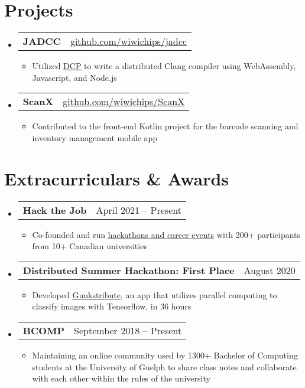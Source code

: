 \documentclass[letterpaper,11pt]{article}
\makeatletter
\newcommand{\resumeItem}[1]{
  \item\small{
    {#1 \vspace{-2pt}}
  }
}
\newcommand{\resumeProjectHeading}[2]{
    \item
    \begin{tabular*}{0.97\textwidth}{l@{\extracolsep{\fill}}r}
      \small#1 & #2 \\
    \end{tabular*}\vspace{-7pt}
}
\newcommand{\resumeSubHeadingListStart}{\begin{itemize}[leftmargin=0.15in, label={}]}
\newcommand{\resumeSubHeadingListEnd}{\end{itemize}}
\newcommand{\resumeItemListStart}{\begin{itemize}}
\newcommand{\resumeItemListEnd}{\end{itemize}\vspace{-5pt}}
\makeatother
\begin{document}
\section{Projects}
  \resumeSubHeadingListStart
    \resumeProjectHeading
      {\textbf{JADCC}}{\href{https://github.com/wiwichips/jadcc}{\underline{github.com/wiwichips/jadcc}}}
      \resumeItemListStart
        \resumeItem{Utilized \href{https://dcp.dev/}{\underline{DCP}} to write a distributed Clang compiler using WebAssembly, Javascript, and Node.js }
      \resumeItemListEnd
        
    \resumeProjectHeading
      {\textbf{ScanX}}{\href{https://github.com/wiwichips/ScanX}{\underline{github.com/wiwichips/ScanX}}}
      \resumeItemListStart
        \resumeItem{Contributed to the front-end Kotlin project for the barcode scanning and inventory management mobile app}
      \resumeItemListEnd
  \resumeSubHeadingListEnd


\section{Extracurriculars \& Awards}
  \resumeSubHeadingListStart
    \resumeProjectHeading
      {\textbf{Hack the Job}}{April 2021 -- Present}
      \resumeItemListStart
        \resumeItem{Co-founded and run \href{https://hackthejob.ca}{\underline{hackathons and career events}} with 200+ participants from 10+ Canadian universities}
      \resumeItemListEnd
        
    \resumeProjectHeading
      {\textbf{Distributed Summer Hackathon: First Place}}{August 2020}
      \resumeItemListStart
        \resumeItem{Developed \href{https://github.com/wiwichips/gcb}{\underline{Gunkstribute}}, an app that utilizes parallel computing to classify images with Tensorflow, in 36 hours}
      \resumeItemListEnd
    
    \resumeProjectHeading
      {\textbf{BCOMP}}{September 2018 -- Present}
      \resumeItemListStart
        \resumeItem{Maintaining an online community used by 1300+ Bachelor of Computing students at the University of Guelph to share class notes and collaborate with each other within the rules of the university}
      \resumeItemListEnd
  \resumeSubHeadingListEnd

\end{document}
